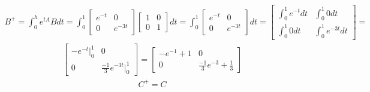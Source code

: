 \documentclass[a4paper,11pt]{article}
\begin{document}
\begin{align*}
B^{+}=\int_{0}^{h}e^{tA}Bdt=
\int_{0}^{1}
\begin{bmatrix}
e^{-t} & 0 \\
0 & e^{-3t}
\end{bmatrix}
\begin{bmatrix}
1 & 0 \\
0 & 1
\end{bmatrix}
dt
=
\int_{0}^{1}
\begin{bmatrix}
e^{-t} & 0 \\
0 & e^{-3t}
\end{bmatrix}
dt
=
\begin{bmatrix}
\int_{0}^{1}e^{-t}dt & \int_{0}^{1}0dt \\
\int_{0}^{1}0dt & \int_{0}^{1}e^{-3t}dt
\end{bmatrix}
=
\end{align*}
\begin{align*}
\begin{bmatrix}
-e^{-t}\Bigr|_{0}^{1} & 0 \\
0 & \frac{-1}{3}e^{-3t}\Bigr|_{0}^{1}
\end{bmatrix}=
\begin{bmatrix}
-e^{-1}+1 & 0 \\
0 & \frac{-1}{3}e^{-3}+\frac{1}{3}
\end{bmatrix}
\end{align*}
\begin{align*}
C^{+}=C
\end{align*}
\end{document}
